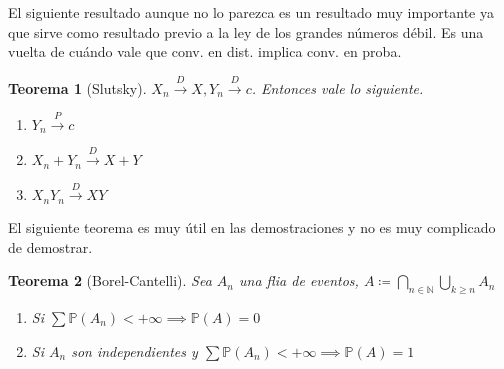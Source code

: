 \documentclass[11pt]{article}
\theoremstyle{plain} %
\newtheorem{teorema}{Teorema}
\theoremstyle{definition}
\theoremstyle{remark}
\def\N{\mathbb{N}}
\def\P{\mathbb{P}}
\newcommand{\proba}{\overset{P}{\to}}
\newcommand{\dist}{\overset{D}{\to}}
\begin{document}
\medskip

El siguiente resultado aunque no lo parezca es un resultado muy importante ya que sirve como resultado previo a la ley de los grandes números débil. Es una vuelta de cuándo vale que conv. en dist. implica conv. en proba.
\begin{teorema}
	[Slutsky]
	$X_n \dist X , Y_n \dist c$. Entonces vale lo siguiente.
	\begin{enumerate}
		\item $Y_n \proba c$
		\item $X_n + Y_n \dist X + Y$
		\item $X_{n}Y_{n} \dist XY$ 
	\end{enumerate}
\end{teorema}

El siguiente teorema es muy útil en las demostraciones y no es muy complicado de demostrar.

\begin{teorema}
	[Borel-Cantelli]
	Sea $A_n$ una flia de eventos, $A \coloneqq \bigcap_{n \in \N} \bigcup_{k \geq n} A_n$
	\begin{enumerate}
		\item Si $\sum \P (A_n) < + \infty \implies \P(A)=0$ 
		\item Si $A_n$ son independientes y $\sum \P (A_n) < + \infty \implies \P(A)=1$ 
	\end{enumerate}	
\end{teorema}
\end{document}
